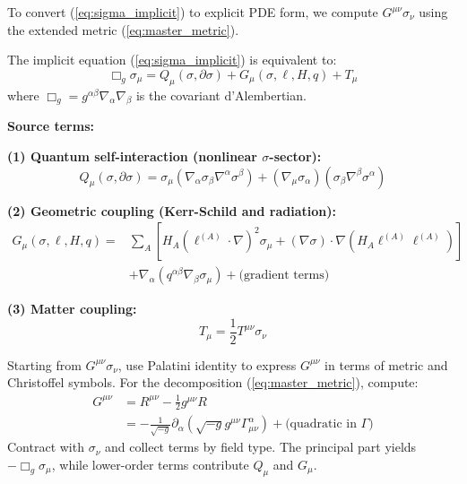 \documentclass[11pt,a4paper]{article}
\theoremstyle{definition}
\theoremstyle{remark}
\begin{document}
		To convert (\ref{eq:sigma_implicit}) to explicit PDE form, we compute $G^{\mu\nu}\sigma_\nu$ using the extended metric (\ref{eq:master_metric}).
		
			The implicit equation (\ref{eq:sigma_implicit}) is equivalent to:
			\begin{equation}\label{eq:sigma_explicit}
				\boxed{\Box_g\sigma_\mu = Q_\mu(\sigma, \partial\sigma) + G_\mu(\sigma, \ell, H, q) + T_\mu}
			\end{equation}
			where $\Box_g = g^{\alpha\beta}\nabla_\alpha\nabla_\beta$ is the covariant d'Alembertian.
		
		\textbf{Source terms:}
		
		\textbf{(1) Quantum self-interaction (nonlinear $\sigma$-sector):}
		\begin{equation}\label{eq:Q_term}
			Q_\mu(\sigma, \partial\sigma) = \sigma_\mu(\nabla_\alpha\sigma_\beta\nabla^\alpha\sigma^\beta) + (\nabla_\mu\sigma_\alpha)(\sigma_\beta\nabla^\beta\sigma^\alpha)
		\end{equation}
		
		\textbf{(2) Geometric coupling (Kerr-Schild and radiation):}
		\begin{equation}\label{eq:G_term}
			\begin{split}
				G_\mu(\sigma, \ell, H, q) = &\sum_A\left[H_A(\ell^{(A)}\cdot\nabla)^2\sigma_\mu + (\nabla\sigma)\cdot\nabla(H_A\ell^{(A)}\ell^{(A)})\right]\\
				&+ \nabla_\alpha(q^{\alpha\beta}\nabla_\beta\sigma_\mu) + \text{(gradient terms)}
			\end{split}
		\end{equation}
		
		\textbf{(3) Matter coupling:}
		\begin{equation}\label{eq:J_matter}
			T_\mu = \frac{1}{2}T^{\mu\nu}\sigma_\nu
		\end{equation}
		
			Starting from $G^{\mu\nu}\sigma_\nu$, use Palatini identity to express $G^{\mu\nu}$ in terms of metric and Christoffel symbols. For the decomposition (\ref{eq:master_metric}), compute:
			\begin{align}
				G^{\mu\nu} &= R^{\mu\nu} - \frac{1}{2}g^{\mu\nu}R\\
				&= -\frac{1}{\sqrt{-g}}\partial_\alpha(\sqrt{-g}g^{\mu\nu}\Gamma^\alpha_{\mu\nu}) + \text{(quadratic in $\Gamma$)}
			\end{align}
			Contract with $\sigma_\nu$ and collect terms by field type. The principal part yields $-\Box_g\sigma_\mu$, while lower-order terms contribute $Q_\mu$ and $G_\mu$.
		
\end{document}
